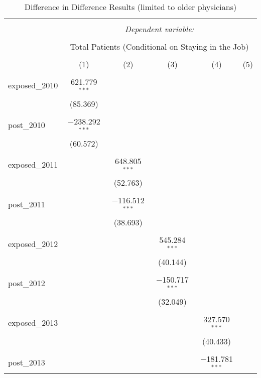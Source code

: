 
\begin{table}[!htbp] \centering 
  \caption{Difference in Difference Results (limited to older physicians)} 
  \label{} 
  \begin{adjustbox}{width=\textwidth}
\begin{tabular}{@{\extracolsep{5pt}}lccccc} 
\\[-1.8ex]\hline 
\hline \\[-1.8ex] 
 & \multicolumn{5}{c}{\textit{Dependent variable:}} \\ 
\cline{2-6} 
\\[-1.8ex] & \multicolumn{5}{c}{Total Patients (Conditional on Staying in the Job)} \\ 
\\[-1.8ex] & (1) & (2) & (3) & (4) & (5)\\ 
\hline \\[-1.8ex] 
 exposed\_2010 & 621.779$^{***}$ &  &  &  &  \\ 
  & (85.369) &  &  &  &  \\ 
  & & & & & \\ 
 post\_2010 & $-$238.292$^{***}$ &  &  &  &  \\ 
  & (60.572) &  &  &  &  \\ 
  & & & & & \\ 
 exposed\_2011 &  & 648.805$^{***}$ &  &  &  \\ 
  &  & (52.763) &  &  &  \\ 
  & & & & & \\ 
 post\_2011 &  & $-$116.512$^{***}$ &  &  &  \\ 
  &  & (38.693) &  &  &  \\ 
  & & & & & \\ 
 exposed\_2012 &  &  & 545.284$^{***}$ &  &  \\ 
  &  &  & (40.144) &  &  \\ 
  & & & & & \\ 
 post\_2012 &  &  & $-$150.717$^{***}$ &  &  \\ 
  &  &  & (32.049) &  &  \\ 
  & & & & & \\ 
 exposed\_2013 &  &  &  & 327.570$^{***}$ &  \\ 
  &  &  &  & (40.433) &  \\ 
  & & & & & \\ 
 post\_2013 &  &  &  & $-$181.781$^{***}$ &  \\ 

\end{tabular}
\end{adjustbox}
\end{table}
